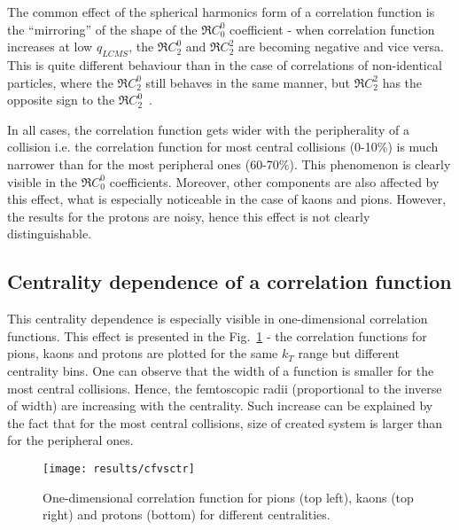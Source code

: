       The common effect of the spherical harmonics form of a correlation function is the ``mirroring'' of the shape of the $\Re C^0_0$ coefficient - when correlation function increases at low $q_{LCMS}$, the $\Re C^0_2$ and $\Re C^2_2$ are becoming negative and vice versa.
      This is quite different behaviour than in the case of correlations of non-identical particles, where the $\Re C^0_2$ still behaves in the same manner, but $\Re C_2^2$ has the opposite sign to the $\Re C^0_2$~\cite{nonidfemto}.

      In all cases, the correlation function gets wider with the peripherality of a collision i.e. the correlation function for most central collisions (0-10\%) is much narrower than for the most peripheral ones (60-70\%).
      This phenomenon is clearly visible in the $\Re C^0_0$ coefficients.
      Moreover, other components are also affected by this effect, what is especially noticeable in the case of kaons and pions.
      However, the results for the protons are noisy, hence this effect is not clearly distinguishable.


    \FloatBarrier
    \clearpage
    \subsection{Centrality dependence of a correlation function}
      This centrality dependence is especially visible in one-dimensional correlation functions.
      This effect is presented in the Fig.~\ref{fig:centr_dep} - the correlation functions for pions, kaons and protons are plotted for the same $k_T$ range but different centrality bins.
      One can observe that the width of a function is smaller for the most central collisions.
      Hence, the femtoscopic radii (proportional to the inverse of width) are increasing with the centrality.
      Such increase can be explained by the fact that for the most central collisions, size of created system is larger than for the peripheral ones.
      \begin{figure}[h]
        \centering
        \centerline{\texttt{[image: results/cfvsctr]}}
        \caption{One-dimensional correlation function for pions (top left), kaons (top right) and protons (bottom) for different centralities.}
      \label{fig:centr_dep}
      \end{figure}
    \FloatBarrier
    \clearpage
